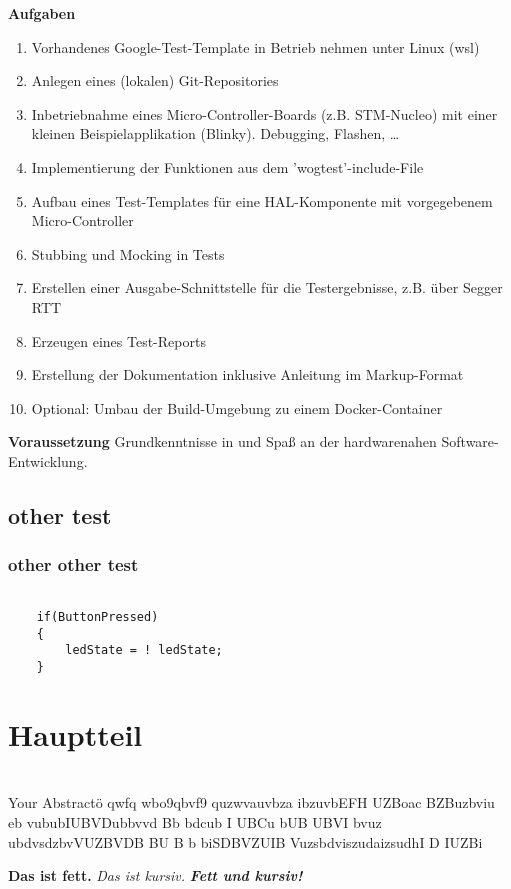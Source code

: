\documentclass[12pt,a4paper]{article}
\begin{document}
\textbf{Aufgaben}
\begin{enumerate}
  \item Vorhandenes Google-Test-Template in Betrieb nehmen unter Linux (wsl)
  \item Anlegen eines (lokalen) Git-Repositories
  \item Inbetriebnahme eines Micro-Controller-Boards (z.B. STM-Nucleo) mit einer kleinen Beispielapplikation (Blinky). Debugging, Flashen, …
  \item Implementierung der Funktionen aus dem 'wogtest'-include-File
  \item Aufbau eines Test-Templates für eine HAL-Komponente mit vorgegebenem Micro-Controller
  \item Stubbing und Mocking in Tests
  \item Erstellen einer Ausgabe-Schnittstelle für die Testergebnisse, z.B. über Segger RTT
  \item Erzeugen eines Test-Reports
  \item Erstellung der Dokumentation inklusive Anleitung im Markup-Format
  \item Optional: Umbau der Build-Umgebung zu einem Docker-Container\newline
\end{enumerate}
\textbf{Voraussetzung}
\newline
Grundkenntnisse in und Spaß an der hardwarenahen Software-Entwicklung.

\newpage
\subsection{other test}
\subsubsection{other other test}
\empty
\begin{verbatim}

    if(ButtonPressed)
    {
        ledState = ! ledState;
    }

\end{verbatim}

\section{Hauptteil}
\section{}


Your Abstractö qwfq wbo9qbvf9 quzwvauvbza ibzuvbEFH UZBoac BZBuzbviu eb vububIUBVDubbvvd Bb bdcub I UBCu bUB UBVI bvuz ubdvsdzbvVUZBVDB BU B b  biSDBVZUIB VuzsbdviszudaizsudhI D IUZBi


\textbf{Das ist fett.}
\textit{Das ist kursiv.}
\textbf{\textit{Fett und kursiv!}}
\end{document}
